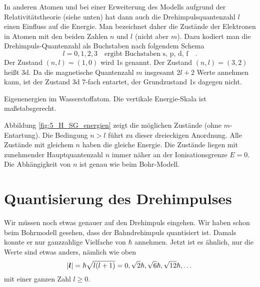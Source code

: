 In anderen Atomen und bei einer Erweiterung des Modells aufgrund der Relativitätstheorie (siehe unten) hat dann auch die Drehimpulsquantenzahl $l$ einen Einfluss auf die Energie. Man bezeichnet daher die Zustände der Elektronen in Atomen mit den beiden Zahlen $n$ und $l$ (nicht aber $m$). Dazu kodiert man die Drehimpuls-Quantenzahl als Buchstaben nach folgendem Schema
\begin{equation}
    l = 0, 1, 2, 3 \quad \text{ergibt Buchstaben \ \ s, p, d, f} \quad .
\end{equation}
Der Zustand $(n,l) = (1,0)$ wird 1s genannt. Der Zustand $(n,l) = (3,2)$ heißt 3d. Da die magnetische Quantenzahl $m$ insgesamt $2l+2$ Werte annehmen kann, ist der Zustand 3d 7-fach entartet, der Grundzustand 1s dagegen nicht.

 
\begin{marginfigure}
    \caption{Eigenenergien im Wasserstoffatom. Die vertikale Energie-Skala ist maßstabsgerecht.}
    \label{fig:5_H_SG_energien}
\end{marginfigure}

Abbildung  \ref{fig:5_H_SG_energien} zeigt die möglichen Zustände (ohne $m$-Entartung). Die Bedingung $n > l$ führt zu dieser dreieckigen Anordnung. Alle Zustände mit gleichem $n$ haben die gleiche Energie. Die Zustände liegen mit zunehmender Hauptquantenzahl $n$ immer näher an der Ionisationsgrenze $E=0$. Die Abhängigkeit von $n$ ist genau wie beim Bohr-Modell.


\section{Quantisierung des Drehimpulses}

Wir müssen noch etwas genauer auf den Drehimpuls eingehen. Wir haben schon beim Bohrmodell gesehen, dass der Bahndrehimpuls quantisiert ist. Damals konnte er nur ganzzahlige Vielfache von $\hbar$ annehmen. Jetzt ist es ähnlich, nur die Werte sind etwas anders, nämlich wie oben
\begin{equation}
    |\boldsymbol{l}| = \hbar \sqrt{l (l+1) } = 0, \sqrt{2} \hbar, \sqrt{6} \hbar, \sqrt{12} \hbar, \dots
\end{equation}
mit einer ganzen Zahl $l \ge 0$.

